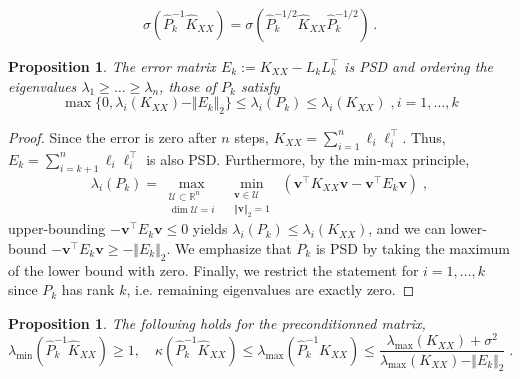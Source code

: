 \documentclass{article}
\newcommand{\vect}[1]{\boldsymbol{\mathbf{#1}}}
\newcommand{\R}{\mathbb R}
\newcommand{\norm}[1]{\Vert #1 \Vert}
\newtheorem{proposition}[theorem]{Proposition}
\begin{document}
\begin{equation} \label{eq:precond_spectrum_equality}
    \sigma(\widehat P_k^{-1} \widehat K_{XX}) = \sigma( \widehat P_k^{-1/2} \widehat K_{XX} \widehat P_k^{-1/2}) \, .
\end{equation}


\begin{proposition} \label{thm:pivchol_eigvals}
The error matrix $E_k := K_{XX} - L_k L_k^\top$ is PSD and ordering the eigenvalues $\lambda_1 \ge \ldots \ge \lambda_n$, those of $P_k$ satisfy
\begin{equation} \label{eq:pivchol_eigvals}
    \max\{0, \lambda_i(K_{XX}) - \norm{E_k}_2 \} \le \lambda_i(P_k) \le \lambda_i(K_{XX}) \; , i = 1, \ldots, k
\end{equation}
\end{proposition}
\begin{proof}
Since the error is zero after $n$ steps, $K_{XX} = \sum_{i=1}^n \vect\ell_i \vect\ell_i^\top$. Thus, $E_k = \sum_{i=k+1}^n \vect\ell_i \vect\ell_i^\top$ is also PSD.
Furthermore, by the min-max principle, 
\begin{equation*}
    \lambda_i(P_k) = 
    \max_{\substack{\mathcal U \subset \R^n \\ \dim \mathcal U = i}} \;
    \min_{\substack{\vect v \in \mathcal U \\ \norm{\vect v}_2 = 1}} \; \left( \vect v^\top K_{XX} \vect v - \vect v^\top E_k \vect v \right) \; ,
\end{equation*}
upper-bounding $-\vect v^\top E_k \vect v \le 0$ yields $\lambda_i(P_k) \le \lambda_i (K_{XX})$, and we can lower-bound $-\vect v^\top E_k \vect v \ge -\norm{E_k}_2$. We emphasize that $P_k$ is PSD by taking the maximum of the lower bound with zero. Finally, we restrict the statement for $i = 1, \ldots, k$ since $P_k$ has rank $k$, i.e. remaining eigenvalues are exactly zero. 
\end{proof}

\begin{proposition} \label{thm:pivchol_precond}
The following holds for the preconditionned matrix,
\begin{equation*}
    \lambda_{\min}( \widehat P_k^{-1} \widehat K_{XX} ) \ge 1, \quad 
    \kappa( \widehat P_k^{-1} \widehat K_{XX} ) \le \lambda_{\max}( \widehat P_k^{-1} \widehat K_{XX} ) \le \frac{\lambda_{\max}(K_{XX}) + \sigma^2}{\lambda_{\max}(K_{XX}) - \norm{E_k}_2} \; .
\end{equation*}
\end{proposition}
\end{document}
